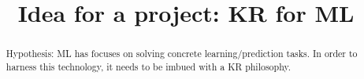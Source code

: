 \documentclass[a4paper,10pt]{article}
\title{Idea for a project: KR for ML}
\author{}
\begin{document}
\maketitle

\begin{abstract}
% 
Hypothesis: ML has focuses on solving concrete learning/prediction tasks. In order to harness this technology, it needs to be imbued with a KR philosophy.
\end{abstract}
\end{document}
